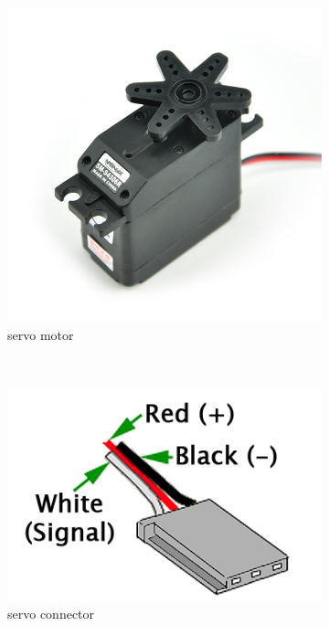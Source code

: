 \documentclass[letterpaper]{article}
\begin{document}
\begin{figure}[h!]
    \centering
    \begin{subfigure}[b]{.45\textwidth}
        \includegraphics[width=\textwidth]{servo.jpg}
        \caption{servo motor}
        \label{fig:servo}
    \end{subfigure}
    ~
    \begin{subfigure}[b]{.45\textwidth}
        \includegraphics[width=\textwidth]{connector.png}
        \caption{servo connector}
        \label{fig:connector}
    \end{subfigure}
    \caption{}
\end{figure}
\end{document}
